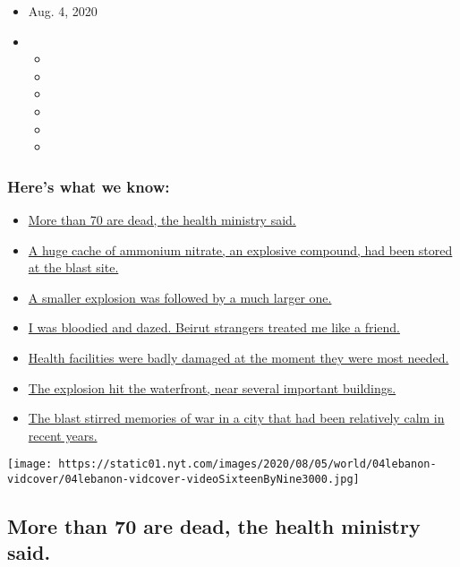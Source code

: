 \begin{itemize}
\item
  Aug. 4, 2020
\item
  \begin{itemize}
  \item
  \item
  \item
  \item
  \item
  \item
  \end{itemize}
\end{itemize}

\hypertarget{heres-what-we-know}{%
\subsubsection{Here's what we know:}\label{heres-what-we-know}}

\begin{itemize}
\tightlist
\item
  \protect\hyperlink{link-2e7a9219}{More than 70 are dead, the health
  ministry said.}
\item
  \protect\hyperlink{link-1971293e}{A huge cache of ammonium nitrate, an
  explosive compound, had been stored at the blast site.}
\item
  \protect\hyperlink{link-12ef1c10}{A smaller explosion was followed by
  a much larger one.}
\item
  \protect\hyperlink{link-1fdae9ed}{I was bloodied and dazed. Beirut
  strangers treated me like a friend.}
\item
  \protect\hyperlink{link-777231d6}{Health facilities were badly damaged
  at the moment they were most needed.}
\item
  \protect\hyperlink{link-1202af77}{The explosion hit the waterfront,
  near several important buildings.}
\item
  \protect\hyperlink{link-3a2e264f}{The blast stirred memories of war in
  a city that had been relatively calm in recent years.}
\end{itemize}

\texttt{[image: https://static01.nyt.com/images/2020/08/05/world/04lebanon-vidcover/04lebanon-vidcover-videoSixteenByNine3000.jpg]}

\hypertarget{more-than-70-are-dead-the-health-ministry-said}{%
\subsection{More than 70 are dead, the health ministry
said.}\label{more-than-70-are-dead-the-health-ministry-said}}

